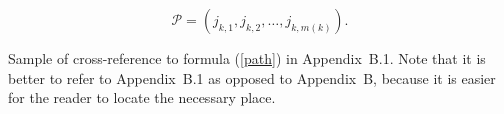 \documentclass[qe,nameyear,final,openaccess]{econsocart}
\theoremstyle{plain}
\begin{document}
\begin{appendix}
\begin{equation}
\label{path}
\mathcal{P}=(j_{k,1},j_{k,2},\dots,j_{k,m(k)}).
\end{equation}

Sample of cross-reference to formula (\ref{path}) in Appendix~B.1. Note that it is better to refer to Appendix~B.1 as opposed to Appendix~B, because it is easier for the reader to locate the necessary place.
\let\subsection\realsubsection
\let\subsubsection\realsubsubsection
\end{appendix}

\end{document}
